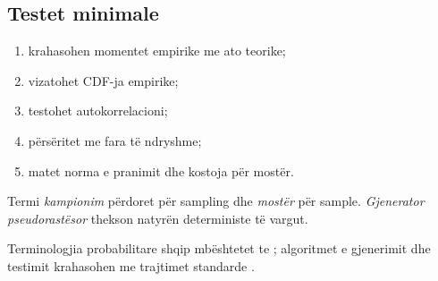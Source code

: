 \subsection{Testet minimale}
\begin{enumerate}
\item krahasohen momentet empirike me ato teorike;
\item vizatohet CDF-ja empirike;
\item testohet autokorrelacioni;
\item përsëritet me fara të ndryshme;
\item matet norma e pranimit dhe kostoja për mostër.
\end{enumerate}
Termi \emph{kampionim} përdoret për sampling dhe \emph{mostër} për sample. \emph{Gjenerator pseudorastësor} thekson natyrën deterministe të vargut.

Terminologjia probabilitare shqip mbështetet te \cite{capollari,butka,tasho}; algoritmet e gjenerimit dhe testimit krahasohen me trajtimet standarde \cite{press,robert}.
